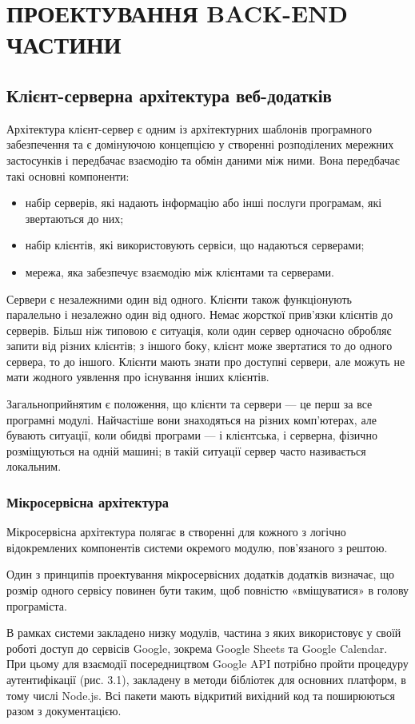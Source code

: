 \section{ПРОЕКТУВАННЯ BACK-END ЧАСТИНИ}
\subsection{Клієнт-серверна архітектура веб-додатків}
Архітектура клієнт-сервер є одним із архітектурних шаблонів програмного забезпечення та є домінуючою концепцією у створенні розподілених мережних застосунків і передбачає взаємодію та обмін даними між ними. Вона передбачає такі основні компоненти:
\begin{itemize}
	\item набір серверів, які надають інформацію або інші послуги програмам, які звертаються до них;
	\item набір клієнтів, які використовують сервіси, що надаються серверами;
	\item мережа, яка забезпечує взаємодію між клієнтами та серверами.
\end{itemize}

Сервери є незалежними один від одного. Клієнти також функціонують паралельно і незалежно один від одного. Немає жорсткої прив'язки клієнтів до серверів. Більш ніж типовою є ситуація, коли один сервер одночасно обробляє запити від різних клієнтів; з іншого боку, клієнт може звертатися то до одного сервера, то до іншого. Клієнти мають знати про доступні сервери, але можуть не мати жодного уявлення про існування інших клієнтів.

Загальноприйнятим є положення, що клієнти та сервери — це перш за все програмні модулі. Найчастіше вони знаходяться на різних комп'ютерах, але бувають ситуації, коли обидві програми — і клієнтська, і серверна, фізично розміщуються на одній машині; в такій ситуації сервер часто називається локальним.

\subsubsection{Мікросервісна архітектура}
Мікросервісна архітектура полягає в створенні для кожного з логічно відокремлених компонентів системи окремого модулю, пов'язаного з рештою.

Один з принципів проектування мікросервісних додатків додатків визначає, що розмір одного сервісу повинен бути таким, щоб повністю «вміщуватися» в голову програміста.

В рамках системи закладено низку модулів, частина з яких використовує у своїй роботі доступ до сервісів Google, зокрема Google Sheets та Google Calendar. При цьому для взаємодії посередництвом Google API потрібно пройти процедуру аутентифікації (рис. 3.1), закладену в методи бібліотек для основних платформ, в тому числі Node.js. Всі пакети мають відкритий вихідний код та поширюються разом з документацією.

